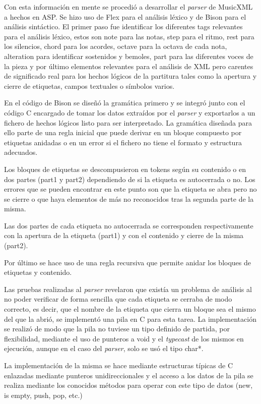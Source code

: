 Con esta información en mente se procedió a desarrollar el \textit{parser} de MusicXML a hechos en ASP. Se hizo uso de Flex para el análisis léxico y de Bison para el análisis sintáctico. El primer paso fue identificar los diferentes tags relevantes para el análisis léxico, estos son note para las notas, step para el ritmo, rest para los silencios, chord para los acordes, octave para la octava de cada nota, alteration para identificar sostenidos y bemoles, part para las diferentes voces de la pieza y por último elementos relevantes para el análisis de XML pero carentes de significado real para los hechos lógicos de la partitura tales como la apertura y cierre de etiquetas, campos textuales o símbolos varios.

En el código de Bison se diseñó la gramática primero y se integró junto con el código C encargado de tomar los datos extraídos por el \textit{parser} y exportarlos a un fichero de hechos lógicos listo para ser interpretado. La gramática diseñada para ello parte de una regla inicial que puede derivar en un bloque compuesto por etiquetas anidadas o en un error si el fichero no tiene el formato y estructura adecuados.

Los bloques de etiquetas se descompusieron en tokens según su contenido o en dos partes (part1 y part2) dependiendo de si la etiqueta es autocerrada o no. Los errores que se pueden encontrar en este punto son que la etiqueta se abra pero no se cierre o que haya elementos de más no reconocidos tras la segunda parte de la misma.

Las dos partes de cada etiqueta no autocerrada se corresponden respectivamente con la apertura de la etiqueta (part1) y con el contenido y cierre de la misma (part2).

Por último se hace uso de una regla recursiva que permite anidar los bloques de etiquetas y contenido.

Las pruebas realizadas al \textit{parser} revelaron que existía un problema de análisis al no poder verificar de forma sencilla que cada etiqueta se cerraba de modo correcto, es decir, que el nombre de la etiqueta que cierra un bloque sea el mismo del que la abrió, se implementó una pila en C para esta tarea. La implementación se realizó de modo que la pila no tuviese un tipo definido de partida, por flexibilidad, mediante el uso de punteros a void y el \textit{typecast} de los mismos en ejecución, aunque en el caso del \textit{parser}, solo se usó el tipo char*.

La implementación de la misma se hace mediante estructuras típicas de C enlazadas mediante punteros unidireccionales y el acceso a los datos de la pila se realiza mediante los conocidos métodos para operar con este tipo de datos (new, is empty, push, pop, etc.) 

